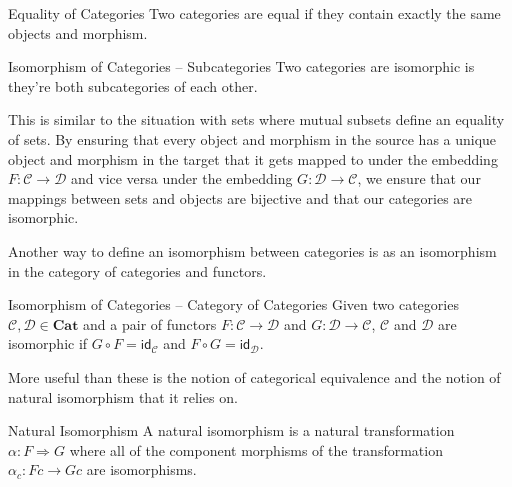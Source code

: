 \documentclass[12pt]{article}
\begin{document}
\begin{definition}{Equality of Categories}{}
  Two categories are equal if they contain exactly the same objects and morphism.
\end{definition}

\begin{definition}{Isomorphism of Categories -- Subcategories}{}
  Two categories are isomorphic is they're both subcategories of each other.
\end{definition}
This is similar to the situation with sets where mutual subsets define an equality of sets.
By ensuring that every object and morphism in the source has a unique object and morphism in the target that it gets mapped to under the embedding $F:\mathcal{C} \rightarrow \mathcal{D}$ and vice versa under the embedding $G:\mathcal{D} \rightarrow \mathcal{C}$,
we ensure that our mappings between sets and objects are bijective and that our categories are isomorphic.

Another way to define an isomorphism between categories is as an isomorphism in the category of categories and functors.
\begin{definition}{Isomorphism of Categories -- Category of Categories}{}
  Given two categories $\mathcal{C}, \mathcal{D} \in \textbf{Cat}$ and a pair of functors $F:\mathcal{C} \rightarrow \mathcal{D}$ and $G:\mathcal{D} \rightarrow \mathcal{C}$,
  $\mathcal{C}$ and $\mathcal{D}$ are isomorphic if $G \circ F = \mathsf{id_\mathcal{C}}$ and $F \circ G = \mathsf{id_\mathcal{D}}$.
\end{definition}


More useful than these is the notion of categorical equivalence and the notion of natural isomorphism that it relies on.

\begin{definition}{Natural Isomorphism}{}
  A natural isomorphism is a natural transformation $\alpha:F\Rightarrow G$ where all of the component morphisms of the transformation $\alpha_{c}:Fc\rightarrow Gc$ are isomorphisms.
\end{definition}
\end{document}
